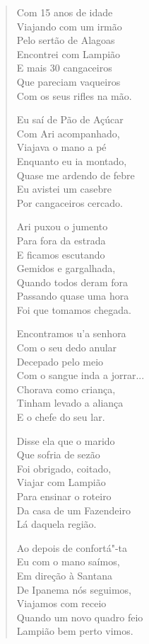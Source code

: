 \begin{verse}
Com 15 anos de idade \\
Viajando com um irmão \\
Pelo sertão de Alagoas \\
Encontrei com Lampião \\
E mais 30 cangaceiros \\
Que pareciam vaqueiros \\
Com os seus rifles na mão. 

Eu saí de Pão de Açúcar \\
Com Ari acompanhado, \\
Viajava o mano a pé \\
Enquanto eu ia montado, \\
Quase me ardendo de febre \\
Eu avistei um casebre \\
Por cangaceiros cercado. 

Ari puxou o jumento \\
Para fora da estrada \\
E ficamos escutando \\
Gemidos e gargalhada, \\
Quando todos deram fora \\
Passando quase uma hora \\
Foi que tomamos chegada. 
\pagebreak

Encontramos u'a senhora \\
Com o seu dedo anular \\
Decepado pelo meio \\
Com o sangue inda a jorrar... \\
Chorava como criança, \\
Tinham levado a aliança \\
E o chefe do seu lar. 

Disse ela que o marido \\
Que sofria de sezão \\
Foi obrigado, coitado, \\
Viajar com Lampião \\
Para ensinar o roteiro \\
Da casa de um Fazendeiro \\
Lá daquela região. 

Ao depois de confortá"-ta \\
Eu com o mano saímos, \\
Em direção à Santana \\
De Ipanema nós seguimos, \\
Viajamos com receio \\
Quando um novo quadro feio \\
Lampião bem perto vimos. 


\end{verse}
